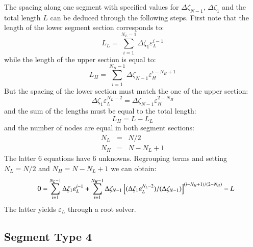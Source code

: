 \documentclass{warpdoc}
\newcommand{\mfd}{\displaystyle}
\begin{document}
The spacing along one segment with specified values for
$\Delta \zeta_{N-1}$, $\Delta \zeta_1$ and the total length $L$
can be deduced through the following steps. First note that the length
of the lower segment section corresponds to:
%
\begin{equation}
 L_L=\mfd\sum_{i=1}^{N_L-1} \Delta \zeta_1 \varepsilon_L^{i-1} 
\end{equation}
%
while the length of the upper section is equal to:
%
\begin{equation}
  L_H=\mfd\sum_{i=1}^{N_H-1} \Delta \zeta_{N-1} \varepsilon_H^{i-N_H+1} 
\end{equation}
%
But the spacing of the lower section must match the one of the upper section:
%
\begin{equation}
 \Delta \zeta_1 \varepsilon_L^{N_L-2} = \Delta \zeta_{N-1} \varepsilon_H^{2-N_H} 
\end{equation}
%
and the sum of the lengths must be equal to the total length:
%
\begin{equation}
 L_H=L-L_L 
\end{equation}
%
and the number of nodes are equal in both segment sections:
%
\begin{eqnarray}
N_L&=&N/2 \\
N_H&=&N-N_L+1
\end{eqnarray}
%
The latter 6 equations have 6 unknowns. Regrouping terms 
and setting $N_L=N/2$ and $N_H=N-N_L+1$ we can obtain:
%
\begin{equation}
 \begin{array}{rl}
  {\rm } & 0=\mfd\sum_{i=1}^{N_L-1} \Delta \zeta_1 \varepsilon_L^{i-1}+\mfd\sum_{i=1}^{N_H-1} \Delta \zeta_{N-1} \left[ ( \Delta \zeta_1 \varepsilon_L^{N_L-2} )/ (\Delta \zeta_{N-1})\right]^{(i-N_H+1)/(2-N_H)}-L \\
 \end{array}
\end{equation}
%
The latter yields $\varepsilon_L$ through a root solver.




\subsection{Segment Type 4}
\end{document}
